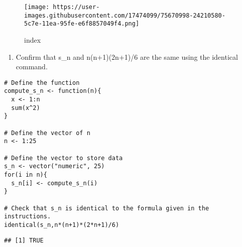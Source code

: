 \documentclass[]{article}
\providecommand{\tightlist}{%
  \setlength{\itemsep}{0pt}\setlength{\parskip}{0pt}}
\begin{document}
\begin{figure}
\centering
\texttt{[image: https://user-images.githubusercontent.com/17474099/75670998-24210580-5c7e-11ea-95fe-e6f8857049f4.png]}
\caption{index}
\end{figure}

\begin{enumerate}
\def\labelenumi{\arabic{enumi}.}
\setcounter{enumi}{9}
\tightlist
\item
  Confirm that s\_n and n(n+1)(2n+1)/6 are the same using the identical
  command.
\end{enumerate}

\begin{verbatim}
# Define the function
compute_s_n <- function(n){
  x <- 1:n
  sum(x^2)
}

# Define the vector of n
n <- 1:25

# Define the vector to store data
s_n <- vector("numeric", 25)
for(i in n){
  s_n[i] <- compute_s_n(i)
}

# Check that s_n is identical to the formula given in the instructions.
identical(s_n,n*(n+1)*(2*n+1)/6)
\end{verbatim}

\begin{verbatim}
## [1] TRUE
\end{verbatim}
\end{document}
